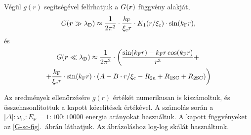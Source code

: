 \documentclass[a4paper,12pt,titlepage]{article}
\newcommand{\RR}{{\vb*{r}}}
\newcommand{\kF}{{k_\text{F}}}
\newcommand{\EF}{{E_\text{F}}}
\newcommand{\xic}{{\xi_\text{c}}}
\begin{document}
Végül $g(r)$ segítségével felírhatjuk a $G(\RR)$ függvény alakját,
\begin{equation}
	G(\RR \gg \lambda_\text{D}) \approx \frac{1}{2 \pi^2} \cdot \frac{\kF}{\xic r} \cdot K_1(r / \xic) \cdot \sin(\kF r),
\end{equation}
és
\begin{multline}
	G(\RR \ll \lambda_\text{D}) \approx \frac{1}{2 \pi^2} \cdot \left( \frac{\sin(\kF r) - \kF r \cos(\kF r)}{r^3} +
	\right. \\ \left. +
	\frac{\kF}{\xic r} \cdot \sin(\kF r) \cdot \left( A - B \cdot r / \xic - R_{2 \text{n}} + R_{1 \text{SC}} + R_{2 \text{SC}} \right) \right)
\end{multline}

Az eredmények ellenőrzésére $g(r)$ értékét numerikusan is kiszámoltuk, és összehasonlítottuk a kapott közelítések értékével.  A számolás során a $\left| \Delta \right| : \omega_\text{D} : \EF = 1 : 100 : 10000$ energia arányokat használtuk.  A kapott függvényeket az \ref{G-sc-fig}.\ ábrán láthatjuk.  Az ábrázoláshoz log-log skálát használtunk.
\end{document}
